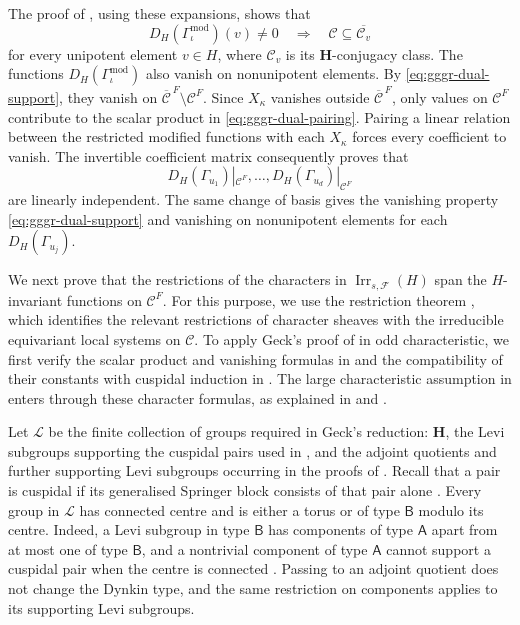 \documentclass[10pt]{amsart}
\theoremstyle{definition}
\let\oldendproof\endproof
\renewenvironment{proof}[1][\proofname]{%
  \oldproof[\bfseries #1]%
}{\oldendproof}
\DeclareMathOperator{\Irr}{Irr}
\numberwithin{equation}{section}
\numberwithin{table}{section}
\begin{document}
\begin{proof}[Proof of Lemma~\ref{lem:type-b-isolated-coverage}]
The proof of \cite[Corollary~3.6(b)]{Geck1994BasicIII}, using these
expansions, shows that
\begin{equation}\label{eq:gggr-dual-support}
 D_H(\Gamma_\iota^{\mathrm{mod}})(v)\ne0
 \quad\Longrightarrow\quad
 \mathcal C\subseteq\overline{\mathcal C_v}
\end{equation}
for every unipotent element $v\in H$, where $\mathcal C_v$ is its
$\mathbf H$-conjugacy class. The functions
$D_H(\Gamma_\iota^{\mathrm{mod}})$ also vanish on nonunipotent elements.
By \eqref{eq:gggr-dual-support}, they vanish on
$\overline{\mathcal C}^{\,F}\setminus\mathcal C^F$. Since $X_\kappa$
vanishes outside $\overline{\mathcal C}^{\,F}$, only values on
$\mathcal C^F$ contribute to the scalar product in
\eqref{eq:gggr-dual-pairing}. Pairing a linear relation between the
restricted modified functions with each $X_\kappa$ forces every
coefficient to vanish. The invertible coefficient matrix consequently
proves that
\[
 D_H(\Gamma_{u_1})|_{\mathcal C^F},\ldots,
 D_H(\Gamma_{u_d})|_{\mathcal C^F}
\]
are linearly independent. The same change of basis gives the vanishing property
\eqref{eq:gggr-dual-support} and vanishing on nonunipotent elements for
each $D_H(\Gamma_{u_j})$.

We next prove that the restrictions of the characters in
$\Irr_{s,\mathcal F}(H)$ span the $H$-invariant functions on
$\mathcal C^F$. For this purpose, we use the restriction theorem
\cite[Theorem~4.5]{Geck1999GGGR}, which identifies the relevant
restrictions of character sheaves with the irreducible equivariant local
systems on $\mathcal C$. To apply Geck's proof of
\cite[Theorem~4.5]{Geck1999GGGR} in odd characteristic, we first verify
the scalar product and vanishing formulas in \cite[(2.4)]{Geck1999GGGR}
and the compatibility of their constants with cuspidal induction in
\cite[(3.3)(b)]{Geck1999GGGR}. The large characteristic assumption in
\cite{Geck1999GGGR} enters through these character formulas, as
explained in \cite[Basic assumptions, p.~140]{Geck1999GGGR} and
\cite[(4.3)]{Geck1999GGGR}.

Let $\mathscr L$ be the finite collection of groups required in Geck's
reduction: $\mathbf H$, the Levi subgroups supporting the cuspidal pairs
used in \cite[(4.9)]{Geck1999GGGR}, and the adjoint quotients and further
supporting Levi subgroups occurring in the proofs of
\cite[Propositions~5.3 and 5.5]{Geck1999GGGR}.
Recall that a pair is cuspidal if its generalised Springer block consists
of that pair alone \cite[(3.3)]{Geck1999GGGR}. Every group in
$\mathscr L$ has connected centre and is either a torus or of type
$\mathsf B$ modulo its centre. Indeed, a Levi subgroup in type
$\mathsf B$ has components of type $\mathsf A$ apart from at most one
of type $\mathsf B$, and a nontrivial component of type $\mathsf A$
cannot support a cuspidal pair
when the centre is connected
\cite[Remark~3.4 and the proof of Theorem~3.8]{Geck1999GGGR}.
Passing to an adjoint quotient does not change the Dynkin type, and the
same restriction on components applies to its supporting Levi subgroups.


\end{proof}
\end{document}
